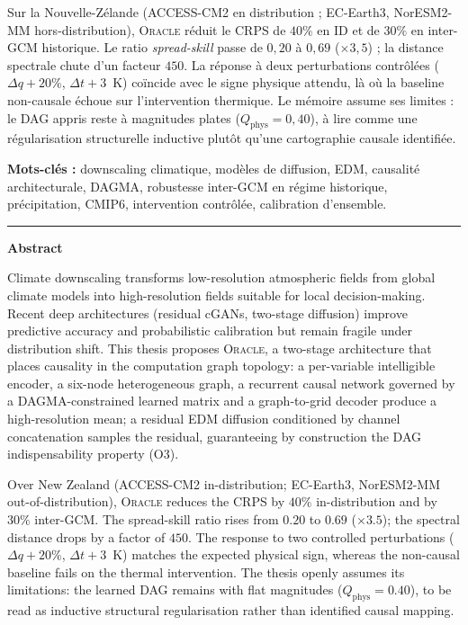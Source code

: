 \documentclass[14pt,a4paper,openany]{extreport}
\newcommand{\Oracle}{\textsc{Oracle}}
\begin{document}
Sur la Nouvelle-Zélande (ACCESS-CM2 en distribution ; EC-Earth3, NorESM2-MM hors-distribution), \Oracle{} réduit le CRPS de $40\%$ en ID et de $30\%$ en inter-GCM historique. Le ratio \emph{spread-skill} passe de $0{,}20$ à $0{,}69$ ($\times 3{,}5$) ; la distance spectrale chute d'un facteur $450$. La réponse à deux perturbations contrôlées ($\Delta q+20\%$, $\Delta t+3$~K) coïncide avec le signe physique attendu, là où la baseline non-causale échoue sur l'intervention thermique. Le mémoire assume ses limites : le DAG appris reste à magnitudes plates ($Q_{\mathrm{phys}}=0{,}40$), à lire comme une régularisation structurelle inductive plutôt qu'une cartographie causale identifiée.

\noindent\textbf{Mots-clés :} downscaling climatique, modèles de diffusion, EDM, causalité architecturale, DAGMA, robustesse inter-GCM en régime historique, précipitation, CMIP6, intervention contrôlée, calibration d'ensemble.

\vspace{0.6em}\hrule\vspace{0.6em}

\begin{center}{\large\bfseries\color{uridarkblue}Abstract}\end{center}

Climate downscaling transforms low-resolution atmospheric fields from global climate models into high-resolution fields suitable for local decision-making. Recent deep architectures (residual cGANs, two-stage diffusion) improve predictive accuracy and probabilistic calibration but remain fragile under distribution shift. This thesis proposes \textsc{Oracle}, a two-stage architecture that places causality in the computation graph topology: a per-variable intelligible encoder, a six-node heterogeneous graph, a recurrent causal network governed by a DAGMA-constrained learned matrix and a graph-to-grid decoder produce a high-resolution mean; a residual EDM diffusion conditioned by channel concatenation samples the residual, guaranteeing by construction the DAG indispensability property (O3).

Over New Zealand (ACCESS-CM2 in-distribution; EC-Earth3, NorESM2-MM out-of-distribution), \textsc{Oracle} reduces the CRPS by $40\%$ in-distribution and by $30\%$ inter-GCM. The spread-skill ratio rises from $0.20$ to $0.69$ ($\times 3.5$); the spectral distance drops by a factor of $450$. The response to two controlled perturbations ($\Delta q+20\%$, $\Delta t+3$~K) matches the expected physical sign, whereas the non-causal baseline fails on the thermal intervention. The thesis openly assumes its limitations: the learned DAG remains with flat magnitudes ($Q_{\mathrm{phys}}=0.40$), to be read as inductive structural regularisation rather than identified causal mapping.
\end{document}
